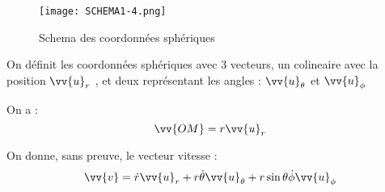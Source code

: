 \begin{figure}[!htb]
    \centering
    \texttt{[image: SCHEMA1-4.png]}
    \caption{Schema des coordonnées sphériques}
    \label{fig:SCHEMA-COSP}
\end{figure}


\begin{definition}
    On définit les coordonnées sphériques avec 3 vecteurs, un colineaire avec la position \(\vv{u}_{r}\) , et deux représentant les angles : \(\vv{u}_{\theta}\) et \(\vv{u}_{\phi}\)  
\end{definition}

\begin{corollary}
    On a : 
    \[
        \vv{OM} = r\vv{u}_{r}
    \]
\end{corollary}

\begin{corollary}
    On donne, sans preuve, le vecteur vitesse : 
    \[
        \vv{v} = \dot{r}\vv{u}_{r} + r\dot{\theta}\vv{u}_{\theta} + r\sin \theta \dot{\phi}\vv{u}_{\phi}
    \]
\end{corollary}